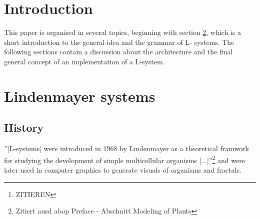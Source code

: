 \documentclass[english]{cpp-hmwk}
\begin{document}

\begin{abstract}
Lindenmayer Systems, short L-systems, are the result of \textbf{research from Lindenmayer et al.}\footnote{ZITIEREN} about the geometric features of plants.
L-systems are a concept to mathematicaly describe and model the growth processes of plant development. They are not only restricted to the plant based developments, but they can also be used to generate fractals.

L-systems start with a defined state and use rules, like a formal grammar, to transform the current state to create the next state of the development or the fractal.
It is therefore possible to successive calculate each state of the development of a plant or a fractal.
Such a state of a L-system can be interpreted as commands for a turtle graphic, which creates the opportunity to draw the created fractals or plant states. 

Goal of this paper is to design an architecture for L-systems, which includes an implementation for L-systems, their creation and an interface for a turtle graphic. The interface should enable the polymorphic use of different turtle graphic implementations. 
\end{abstract}

\pagebreak
\section{Introduction}
This paper is organised in several topics, beginning with section \ref{section:lindenmayer}, which is a short introduction to the general idea and the grammar of L- systems.
The following sections contain a discussion about the architecture and the final general concept of an implementation of a L-system.




\pagebreak
\section{Lindenmayer systems}
\label{section:lindenmayer}
\subsection{History}
''[L-systems] were introduced in 1968 by Lindenmayer as a theoretical framwork for studying the development of simple multicellular organisms [...]''\footnote{Zitiert ausd abop Preface - Abschnitt Modeling of Plants} and were later used in computer graphics to generate visuals of organisms and fractals.
\end{document}
